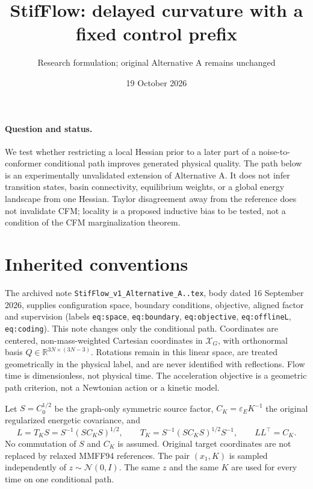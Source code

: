 \documentclass[11pt]{article}
\title{StifFlow: delayed curvature with a fixed control prefix}
\author{Research formulation; original Alternative A remains unchanged}
\date{19 October 2026}
\newcommand{\R}{\mathbb R}
\begin{document}
\maketitle

\paragraph{Question and status.}
We test whether restricting a local Hessian prior to a later part of a
noise-to-conformer conditional path improves generated physical quality.
The path below is an experimentally unvalidated extension of Alternative A.
It does not infer transition states, basin connectivity, equilibrium weights,
or a global energy landscape from one Hessian.
Taylor disagreement away from the reference does not invalidate CFM;
locality is a proposed inductive bias to be tested, not a condition of the
CFM marginalization theorem.

\section{Inherited conventions}
The archived note \texttt{StifFlow\_v1\_Alternative\_A..tex}, body dated
16 September 2026, supplies configuration space, boundary conditions,
objective, aligned factor and supervision (labels \texttt{eq:space},
\texttt{eq:boundary}, \texttt{eq:objective}, \texttt{eq:offlineL},
\texttt{eq:coding}). This note changes only the conditional path.
Coordinates are centered, non-mass-weighted Cartesian coordinates in
$\mathcal X_G$, with orthonormal basis $Q\in\R^{3N\times(3N-3)}$.
Rotations remain in this linear space, are treated geometrically in the
physical label, and are never identified with reflections.
Flow time is dimensionless, not physical time. The acceleration objective
is a geometric path criterion, not a Newtonian action or a kinetic model.

Let $S=C_0^{1/2}$ be the graph-only symmetric source factor,
$C_K=\varepsilon_E K^{-1}$ the original regularized energetic covariance,
and
\begin{equation}
 L=T_KS=S^{-1}(SC_KS)^{1/2},\qquad
 T_K=S^{-1}(SC_KS)^{1/2}S^{-1},\qquad LL^\top=C_K.
 \label{eq:aligned}
\end{equation}
No commutation of $S$ and $C_K$ is assumed. Original target coordinates are
not replaced by relaxed MMFF94 references. The pair $(x_1,K)$ is sampled
independently of $z\sim\mathcal N(0,I)$. The same $z$ and the same $K$ are
used for every time on one conditional path.
\end{document}
